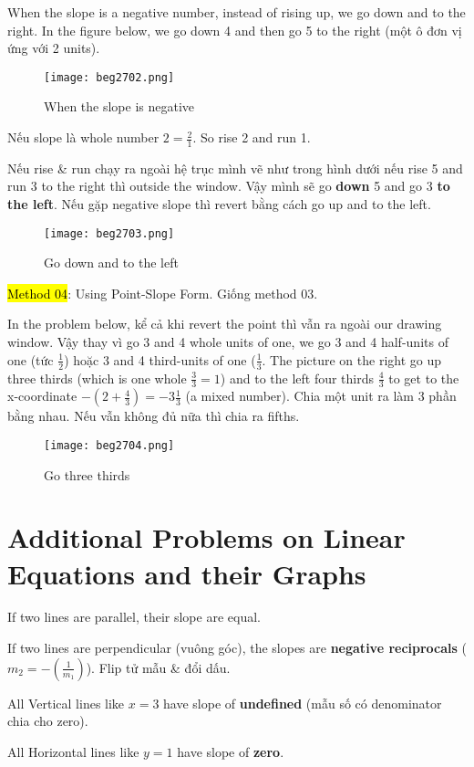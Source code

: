 When the slope is a negative number, instead of rising up, we go down and to the right. In the figure below, we go down 4 and then go 5 to the right (một ô đơn vị ứng với 2 units).

\begin{figure}[htb!]
  \centering
  \texttt{[image: beg2702.png]}
  \caption{When the slope is negative}
\end{figure}

\vspace{0.5cm}

Nếu slope là whole number $2=\frac{2}{1}$. So rise 2 and run 1.


Nếu rise \& run chạy ra ngoài hệ trục mình vẽ như trong hình dưới nếu rise 5 and run 3 to the right thì outside the window. Vậy mình sẽ go \textbf{down} 5 and go 3 \textbf{to the left}. Nếu gặp negative slope thì revert bằng cách go up and to the left.

\begin{figure}[htb!]
  \centering
  \texttt{[image: beg2703.png]}
  \caption{Go down and to the left}
\end{figure}

\hl{Method 04}: Using Point-Slope Form. Giống method 03.

\vspace{8mm}

In the problem below, kể cả khi revert the point thì vẫn ra ngoài our drawing window. Vậy thay vì go 3 and 4 whole units of one, we go 3 and 4 half-units of one (tức $\frac{1}{2}$) hoặc 3 and 4 third-units of one ($\frac{1}{3}$. The picture on the right go up three thirds (which is one whole $\frac{3}{3}=1$) and to the left four thirds $\frac{4}{3}$ to get to the x-coordinate $-(2+\frac{4}{3})=-3\frac{1}{3}$ (a mixed number). Chia một unit ra làm 3 phần bằng nhau. Nếu vẫn không đủ nữa thì chia ra fifths.

\begin{figure}[htb!]
  \centering
  \texttt{[image: beg2704.png]}
  \caption{Go three thirds}
\end{figure}

\section{Additional Problems on Linear Equations and their Graphs}

If two lines are parallel, their slope are equal.

If two lines are perpendicular (vuông góc), the slopes are \textbf{negative reciprocals} ($m_{2}=-(\frac{1}{m_{1}})$). Flip tử mẫu \& đổi dấu.


\vspace{.4cm}

All Vertical lines like $x=3$ have slope of \textbf{undefined} (mẫu số có denominator chia cho zero).

All Horizontal lines like $y=1$ have slope of \textbf{zero}.

